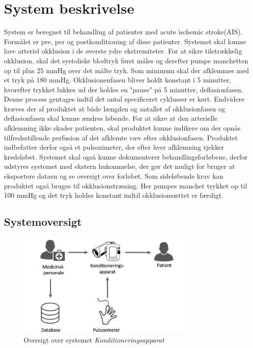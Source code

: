 \chapter{System beskrivelse}
System er beregnet til behandling af patienter med acute ischemic stroke(AIS). Formålet er pre, per og postkonditioning af disse patienter. Systemet skal kunne lave arteriel okklusion i de øverste ydre ekstremiteter. For at sikre tilstrækkelig okklusion, skal det systoliske blodtryk først måles og derefter pumpe manchetten op til plus 25 mmHg over det målte tryk. Som minimum skal der afklemmes med et tryk på 180 mmHg. Okklusionenfasen  bliver holdt konstant i 5 minutter, hvorefter trykket lukkes ud der holdes en "pause" på 5 minutter, deflasionfasen. Denne process gentages indtil det antal specificeret cyklusser er kørt. Endvidere kræves der af produktet at både længden og antallet af okklusionfasen og deflasionfasen skal kunne ændres løbende. 
For at sikre at den arterielle afklemning ikke skader patienten, skal produktet kunne indikere om der opnås tilfredsstillende perfusion af det afklemte væv efter okklusionfasen. Produktet indbefatter derfor også et pulsoximeter, der efter hver afklemning tjekker kredsløbet. Systemet skal også kunne dokumenterer behandlingsforløbene, derfor udstyres systemet med ekstern hukommelse, der gør det muligt for bruger at eksportere dataen og se oversigt over forløbet. 
Som sideløbende krav kan produktet også bruges til okklusionstræning. Her pumpes manchet trykket op til 100 mmHg og det tryk holdes konstant indtil okklusionsættet er færdigt.  

\section{Systemoversigt}
\begin{figure}[H]
	\includegraphics[width=0.8\textwidth]{Illustrationer/saelgertegning.png}
	\caption{Oversigt over systemet \textit{Konditioneringsapparat}}
\end{figure}
